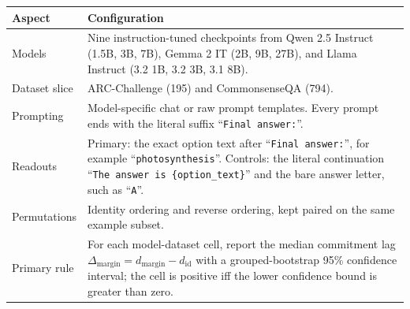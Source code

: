 \begin{tabularx}{\linewidth}{@{}lX@{}}
\toprule
\textbf{Aspect} & \textbf{Configuration}\\
\midrule
Models & Nine instruction-tuned checkpoints from Qwen 2.5 Instruct (1.5B, 3B, 7B), Gemma 2 IT (2B, 9B, 27B), and Llama Instruct (3.2 1B, 3.2 3B, 3.1 8B). \\
Dataset slice & ARC-Challenge (195) and CommonsenseQA (794). \\
Prompting & Model-specific chat or raw prompt templates. Every prompt ends with the literal suffix ``\texttt{Final answer:}''. \\
Readouts & Primary: the exact option text after ``\texttt{Final answer:}'', for example ``\texttt{photosynthesis}''. Controls: the literal continuation ``\texttt{The answer is \{option\_text\}}'' and the bare answer letter, such as ``\texttt{A}''. \\
Permutations & Identity ordering and reverse ordering, kept paired on the same example subset. \\
Primary rule & For each model-dataset cell, report the median commitment lag $\Delta_{\mathrm{margin}} = d_{\mathrm{margin}} - d_{\mathrm{id}}$ with a grouped-bootstrap 95\% confidence interval; the cell is positive iff the lower confidence bound is greater than zero. \\
\bottomrule
\end{tabularx}
